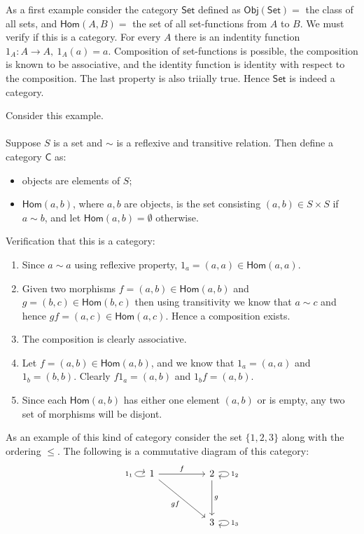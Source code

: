\begin{example}[Sets]
  As a first example consider the category $\mathsf{Set}$ defined as $\mathsf{Obj}(\mathsf{Set}) =$ the class of all sets, and $\mathsf{Hom}(A,B) = $ the set of all set-functions from $A$ to $B$. We must verify if this is a category. For every $A$ there is an indentity function $1_A:A\to A,\ 1_A(a) = a$. Composition of set-functions is possible, the composition is known to be associative, and the identity function is identity with respect to the composition. The last property is also triially true. Hence $\mathsf{Set}$ is indeed a category. 
\end{example}
\begin{example}
  Consider this example.
  \paragraph{} Suppose $S$ is a set and $\sim$ is a reflexive and transitive relation. Then define a category $\mathsf{C}$ as:
  \begin{itemize}
    \item objects are elements of $S$;
    \item $\mathsf{Hom}(a,b)$, where $a,b$ are objects, is the set consisting $(a,b)\in S\times S$ if $a\sim b$, and let $\mathsf{Hom}(a,b) = \emptyset$ otherwise. 
  \end{itemize}
  Verification that this is a category:
  \begin{enumerate}
    \item Since $a\sim a$ using reflexive property, $1_a = (a,a) \in \mathsf{Hom}(a,a)$.
    \item Given two morphisms $f= (a,b)\in \mathsf{Hom}(a,b)$ and $g = (b,c)\in \mathsf{Hom}(b,c)$ then using transitivity we know that $a\sim c$ and hence $gf = (a,c) \in \mathsf{Hom}(a,c)$. Hence a composition exists.
    \item The composition is clearly associative. 
    \item Let $f = (a,b)\in \mathsf{Hom}(a,b)$, and we know that $1_a=(a,a)$ and $1_b=(b,b)$. Clearly $f1_a = (a,b)$ and $1_bf = (a,b)$. 
    \item Since each $\mathsf{Hom}(a,b)$ has either one element $(a,b)$ or is empty, any two set of morphisms will be disjont. 
  \end{enumerate}
  As an example of this kind of category consider the set $\{1,2,3\}$ along with the ordering $\leq$. The following is a commutative diagram of this category:
  \[
    \begin{tikzcd}[sep=huge]
      1 \arrow[loop left]{l}{1_1}\arrow{r}{f} \arrow[swap]{dr}{gf} & 2\arrow[loop right]{r}{1_2} \arrow{d}{g} \\ & 3 \arrow[loop right]{r}{1_3} 
    \end{tikzcd}
  \]
\end{example}
